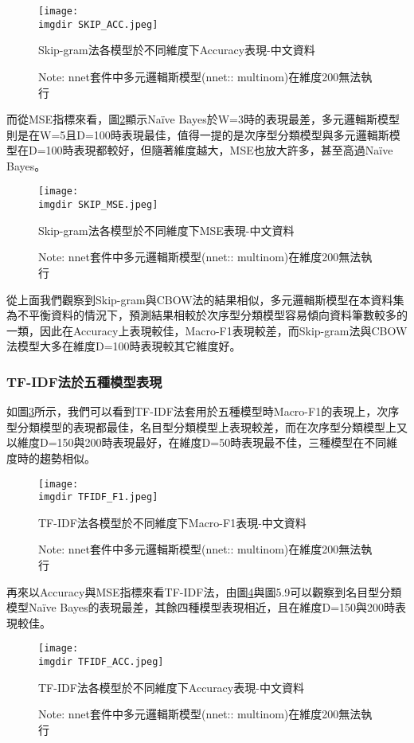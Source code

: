 \begin{figure}[H]
    \centering
        \texttt{[image: \\imgdir SKIP\_ACC.jpeg]}
    \caption{Skip-gram法各模型於不同維度下Accuracy表現-中文資料}
    \label{pic.5.3.2-2}
    \caption*{\footnotesize{Note: nnet套件中多元邏輯斯模型(nnet:: multinom)在維度200無法執行}}
\end{figure}	
	
	而從MSE指標來看，圖\ref{pic.5.3.2-3}顯示Naïve Bayes於W=3時的表現最差，多元邏輯斯模型則是在W=5且D=100時表現最佳，值得一提的是次序型分類模型與多元邏輯斯模型在D=100時表現都較好，但隨著維度越大，MSE也放大許多，甚至高過Naïve Bayes。
	
\begin{figure}[H]
    \centering
        \texttt{[image: \\imgdir SKIP\_MSE.jpeg]}
    \caption{Skip-gram法各模型於不同維度下MSE表現-中文資料}
    \label{pic.5.3.2-3}
    \caption*{\footnotesize{Note: nnet套件中多元邏輯斯模型(nnet:: multinom)在維度200無法執行}}
\end{figure}	
	
	從上面我們觀察到Skip-gram與CBOW法的結果相似，多元邏輯斯模型在本資料集為不平衡資料的情況下，預測結果相較於次序型分類模型容易傾向資料筆數較多的一類，因此在Accuracy上表現較佳，Macro-F1表現較差，而Skip-gram法與CBOW法模型大多在維度D=100時表現較其它維度好。


\subsubsection{TF-IDF法於五種模型表現}

	如圖\ref{pic.5.3.3-1}所示，我們可以看到TF-IDF法套用於五種模型時Macro-F1的表現上，次序型分類模型的表現都最佳，名目型分類模型上表現較差，而在次序型分類模型上又以維度D=150與200時表現最好，在維度D=50時表現最不佳，三種模型在不同維度時的趨勢相似。
	
\begin{figure}[H]
    \centering
        \texttt{[image: \\imgdir TFIDF\_F1.jpeg]}
    \caption{TF-IDF法各模型於不同維度下Macro-F1表現-中文資料}
    \label{pic.5.3.3-1}
    \caption*{\footnotesize{Note: nnet套件中多元邏輯斯模型(nnet:: multinom)在維度200無法執行}}
\end{figure}
	
	
\newpage


	再來以Accuracy與MSE指標來看TF-IDF法，由圖\ref{pic.5.3.3-2}與圖5.9可以觀察到名目型分類模型Naïve Bayes的表現最差，其餘四種模型表現相近，且在維度D=150與200時表現較佳。
	
\begin{figure}[H]
    \centering
        \texttt{[image: \\imgdir TFIDF\_ACC.jpeg]}
    \caption{TF-IDF法各模型於不同維度下Accuracy表現-中文資料}
    \label{pic.5.3.3-2}
    \caption*{\footnotesize{Note: nnet套件中多元邏輯斯模型(nnet:: multinom)在維度200無法執行}}
\end{figure}	
	

